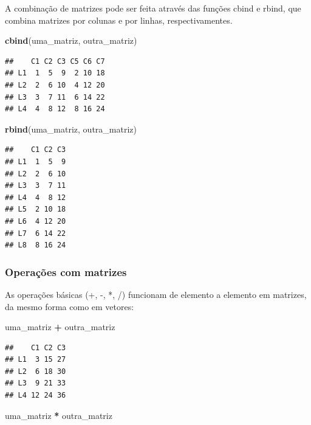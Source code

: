 \documentclass[
]{book}
\newenvironment{Shaded}{\begin{snugshade}}{\end{snugshade}}
\newcommand{\FunctionTok}[1]{\textcolor[rgb]{0.13,0.29,0.53}{\textbf{#1}}}
\newcommand{\NormalTok}[1]{#1}
\newcommand{\SpecialCharTok}[1]{\textcolor[rgb]{0.81,0.36,0.00}{\textbf{#1}}}
\begin{document}
A combinação de matrizes pode ser feita através das funções cbind e rbind, que combina matrizes por colunas e por linhas, respectivamentes.

\begin{Shaded}
\begin{Highlighting}[]
\FunctionTok{cbind}\NormalTok{(uma\_matriz, outra\_matriz)}
\end{Highlighting}
\end{Shaded}

\begin{verbatim}
##    C1 C2 C3 C5 C6 C7
## L1  1  5  9  2 10 18
## L2  2  6 10  4 12 20
## L3  3  7 11  6 14 22
## L4  4  8 12  8 16 24
\end{verbatim}

\begin{Shaded}
\begin{Highlighting}[]
\FunctionTok{rbind}\NormalTok{(uma\_matriz, outra\_matriz)}
\end{Highlighting}
\end{Shaded}

\begin{verbatim}
##    C1 C2 C3
## L1  1  5  9
## L2  2  6 10
## L3  3  7 11
## L4  4  8 12
## L5  2 10 18
## L6  4 12 20
## L7  6 14 22
## L8  8 16 24
\end{verbatim}

\subsubsection{Operações com matrizes}\label{operauxe7uxf5es-com-matrizes}

As operações básicas (+, -, *, /) funcionam de elemento a elemento em matrizes, da mesmo forma como em vetores:

\begin{Shaded}
\begin{Highlighting}[]
\NormalTok{uma\_matriz }\SpecialCharTok{+}\NormalTok{ outra\_matriz}
\end{Highlighting}
\end{Shaded}

\begin{verbatim}
##    C1 C2 C3
## L1  3 15 27
## L2  6 18 30
## L3  9 21 33
## L4 12 24 36
\end{verbatim}

\begin{Shaded}
\begin{Highlighting}[]
\NormalTok{uma\_matriz }\SpecialCharTok{*}\NormalTok{ outra\_matriz}
\end{Highlighting}
\end{Shaded}
\end{document}
